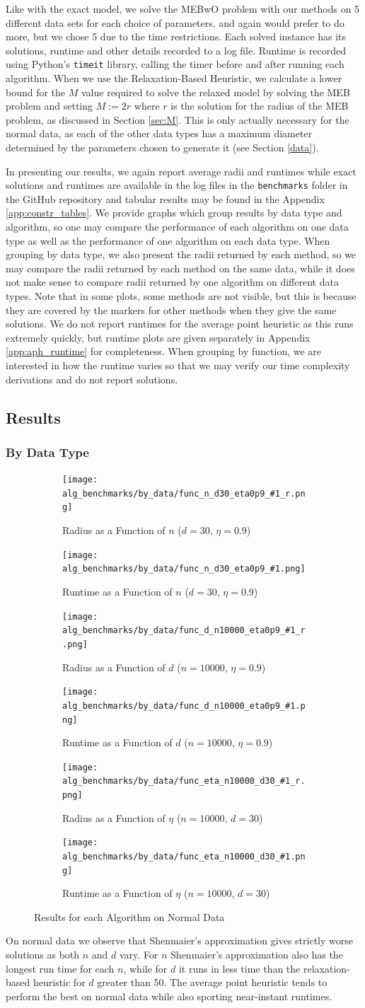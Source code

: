 \documentclass[11pt,twoside]{report}
\newcommand{\benchmarkfiguresix}[2]{
    \begin{figure}[ht]
        \centering
        \begin{subfigure}[b]{0.475\textwidth}
            \centering
            \texttt{[image: alg\_benchmarks/by\_data/func\_n\_d30\_eta0p9\_\#1\_r.png]}
            \caption{Radius as a Function of $n$ ($d=30$, $\eta=0.9$)}
            \label{fig:constr_r_#1_n}
        \end{subfigure}
        \hfill
        \begin{subfigure}[b]{0.475\textwidth}
            \centering
            \texttt{[image: alg\_benchmarks/by\_data/func\_n\_d30\_eta0p9\_\#1.png]}
            \caption{Runtime as a Function of $n$ ($d=30$, $\eta=0.9$)}
            \label{fig:constr_runtime_#1_n}
        \end{subfigure}
        
        \begin{subfigure}[b]{0.475\textwidth}
            \centering
            \texttt{[image: alg\_benchmarks/by\_data/func\_d\_n10000\_eta0p9\_\#1\_r.png]}
            \caption{Radius as a Function of $d$ ($n=10000$, $\eta=0.9$)}
            \label{fig:constr_r_#1_d}
        \end{subfigure}
        \hfill
        \begin{subfigure}[b]{0.475\textwidth}
            \centering
            \texttt{[image: alg\_benchmarks/by\_data/func\_d\_n10000\_eta0p9\_\#1.png]}
            \caption{Runtime as a Function of $d$ ($n=10000$, $\eta=0.9$)}
            \label{fig:constr_runtime_#1_d}
        \end{subfigure}
        
        \begin{subfigure}[b]{0.475\textwidth}
            \centering
            \texttt{[image: alg\_benchmarks/by\_data/func\_eta\_n10000\_d30\_\#1\_r.png]}
            \caption{Radius as a Function of $\eta$ ($n=10000$, $d=30$)}
            \label{fig:constr_r_#1_eta}
        \end{subfigure}
        \hfill
        \begin{subfigure}[b]{0.475\textwidth}
            \centering
            \texttt{[image: alg\_benchmarks/by\_data/func\_eta\_n10000\_d30\_\#1.png]}
            \caption{Runtime as a Function of $\eta$ ($n=10000$, $d=30$)}
            \label{fig:constr_runtime_#1_eta}
        \end{subfigure}
        \caption{Results for each Algorithm on #2 Data}
        \label{fig:constr_#1}
    \end{figure}
}
\theoremstyle{definition}
\numberwithin{theorem}{section}
\numberwithin{definition}{section}
\numberwithin{lemma}{section}
\numberwithin{proposition}{section}
\numberwithin{equation}{section}
\numberwithin{figure}{section}
\begin{document}
Like with the exact model, we solve the MEBwO problem with our methods on 5 different data sets for each choice of parameters, and again would prefer to do more, but we chose 5 due to the time restrictions. Each solved instance has its solutions, runtime and other details recorded to a log file. Runtime is recorded using Python's \texttt{timeit} library, calling the timer before and after running each algorithm. When we use the Relaxation-Based Heuristic, we calculate a lower bound for the $M$ value required to solve the relaxed model by solving the MEB problem and setting $M:=2r$ where $r$ is the solution for the radius of the MEB problem, as discussed in Section \ref{sec:M}. This is only actually necessary for the normal data, as each of the other data types has a maximum diameter determined by the parameters chosen to generate it (see Section \ref{data}).

In presenting our results, we again report average radii and runtimes while exact solutions and runtimes are available in the log files in the \texttt{benchmarks} folder in the GitHub repository and tabular results may be found in the Appendix \ref{app:constr_tables}. We provide graphs which group results by data type and algorithm, so one may compare the performance of each algorithm on one data type as well as the performance of one algorithm on each data type. When grouping by data type, we also present the radii returned by each method, so we may compare the radii returned by each method on the same data, while it does not make sense to compare radii returned by one algorithm on different data types. Note that in some plots, some methods are not visible, but this is because they are covered by the markers for other methods when they give the same solutions. We do not report runtimes for the average point heuristic as this runs extremely quickly, but runtime plots are given separately in Appendix \ref{app:aph_runtime} for completeness. When grouping by function, we are interested in how the runtime varies so that we may verify our time complexity derivations and do not report solutions.

\subsection{Results}
\subsubsection{By Data Type}
\benchmarkfiguresix{normal}{Normal}
On normal data we observe that Shenmaier's approximation gives strictly worse solutions as both $n$ and $d$ vary. For $n$ Shenmaier's approximation also has the longest run time for each $n$, while for $d$ it runs in less time than the relaxation-based heuristic for $d$ greater than 50. The average point heuristic tends to perform the best on normal data while also sporting near-instant runtimes.
\end{document}
